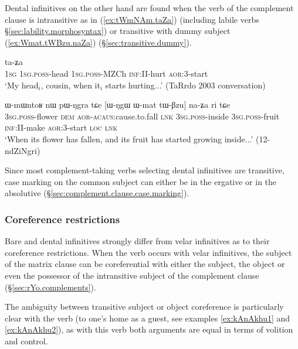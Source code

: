 Dental infinitives on the other hand are  found when the verb of the complement clause is intransitive as in (\ref{ex:tWmNAm.taZa}) (including labile verbs §\ref{sec:lability.morphosyntax}) or transitive with dummy subject (\ref{ex:Wmat.tWBzu.naZa}) (§\ref{sec:transitive.dummy}).

\begin{exe} 
\ex \label{ex:tWmNAm.taZa}
 ta-ʑa \\
\textsc{1sg} \textsc{1sg}.\textsc{poss}-head \textsc{1sg}.\textsc{poss}-MZCh \textsc{inf}:II-hurt \textsc{aor}:3\flobv{}-start \\
\glt `My head$_i$, cousin, when it$_i$ starts hurting...' (TaRrdo 2003 conversation)
  \end{exe} 
  
\begin{exe} 
\ex \label{ex:Wmat.tWBzu.naZa}
\gll ɯ-mɯntoʁ nɯ pɯ-ŋgra tɕe [ɯ-ŋgɯ ɯ-mat tɯ-βzu] na-ʑa ri tɕe \\
\textsc{3sg}.\textsc{poss}-flower \textsc{dem} \textsc{aor}-\textsc{acaus}:cause.to.fall \textsc{lnk} \textsc{3sg}.\textsc{poss}-inside \textsc{3sg}.\textsc{poss}-fruit \textsc{inf}:II-make \textsc{aor}:3\flobv{}-start \textsc{loc} \textsc{lnk} \\
\glt `When its flower has fallen, and its fruit has started growing inside...' (12-ndZiNgri)
 \end{exe} 
 
Since most com\-ple\-ment-taking verbs selecting dental infinitives are transitive, case marking on the common subject can either be in the ergative or in the absolutive (§\ref{sec:complement.clause.case.marking}).

\subsubsection{Coreference restrictions} \label{sec:bare.inf.coreference}
Bare and dental infinitives strongly differ from velar infinitives as to their coreference restrictions. When the verb  occurs with velar infinitives, the subject of the matrix clause can be coreferential with either the subject, the object or even the possessor of the intransitive subject of the complement clause (§\ref{sec:rYo.complements}).

The ambiguity between transitive subject or object coreference is particularly clear with the verb  (to one's home as a guest, see examples \ref{ex:kAnAkhu1} and \ref{ex:kAnAkhu2}), as with this verb both arguments are equal in terms of volition and control.

